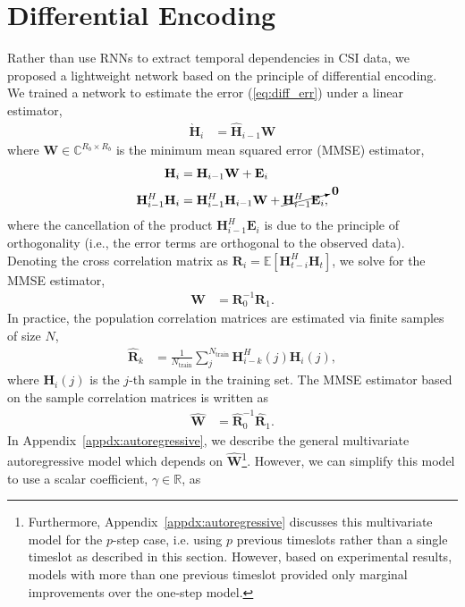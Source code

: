 \section{Differential Encoding} \label{sect:diff-enc}

Rather than use RNNs to extract temporal dependencies in CSI data, we proposed a lightweight network based on the principle of differential encoding. We trained a network to estimate the error (\ref{eq:diff_err}) under a linear estimator, 
\begin{align*}
	\grave{\mathbf H}_i &=  \hat{\mathbf H}_{i-1} \mathbf W
\end{align*}
where $\mathbf W \in \mathbb C^{R_b \times R_b}$ is the minimum mean squared error (MMSE) estimator,
\begin{align*}
	\mathbf H_i &= \mathbf H_{i-1}\mathbf W + \mathbf E_i \\
	\mathbf H_{i-1}^H\mathbf H_i &= \mathbf H_{i-1}^H\mathbf H_{i-1} \mathbf W + \cancelto{\mathbf 0}{\mathbf H_{i-1}^H\mathbf E_i},
\end{align*}
where the cancellation of the product $\mathbf H_{i-1}^H\mathbf E_i$ is due to the principle of orthogonality (i.e., the error terms are orthogonal to the observed data). Denoting the cross correlation matrix as $\mathbf R_{i} = \mathbb{E}\left[\mathbf H_{t-i}^H\mathbf H_{t}\right]$, we solve for the MMSE estimator,
\begin{align*}
	\mathbf W &= \mathbf R_0^{-1} \mathbf R_1.
\end{align*}
In practice, the population correlation matrices are estimated
via finite samples of size $N$,
\begin{align*}
	\mathbf{\hat R}_k &= \frac {1}{N_{\text{train}}} \sum_{j}^{N_\text{train}} \mathbf H_{i-k}^H(j)\mathbf H_{i}(j),
\end{align*}
where $\mathbf H_i(j)$ is the $j$-th sample in the training set.
The MMSE estimator based on the sample correlation matrices is written as
\begin{align*}
	\hat{\mathbf W} &= \hat{\mathbf R}_0^{-1} \hat{\mathbf R}_1.
\end{align*}
In Appendix~\ref{appdx:autoregressive}, we describe the general multivariate autoregressive model which depends on $\hat{\mathbf{W}}$\footnote{Furthermore, Appendix~\ref{appdx:autoregressive} discusses this multivariate model for the $p$-step case, i.e. using $p$ previous timeslots rather than a single timeslot as described in this section. However, based on experimental results, models with more than one previous timeslot provided only marginal improvements over the one-step model.}. However, we can simplify this model to use a scalar coefficient, $\gamma \in \mathbb R$, as
